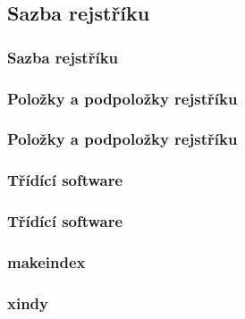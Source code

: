 \subsection{Sazba rejstříku}
\begin{frame}
	\frametitle{Sazba rejstříku}
	\UnderConstruction
\end{frame}


\subsubsection{Položky a podpoložky rejstříku}
\begin{frame}
	\frametitle{Položky a podpoložky rejstříku}
	\UnderConstruction
\end{frame}


\subsubsection{Třídící software}
\begin{frame}
	\frametitle{Třídící software}
	\UnderConstruction
\end{frame}


\begin{frame}
	\frametitle{makeindex}
	\UnderConstruction
\end{frame}


\begin{frame}
	\frametitle{xindy}
	\UnderConstruction
\end{frame}

\endinput